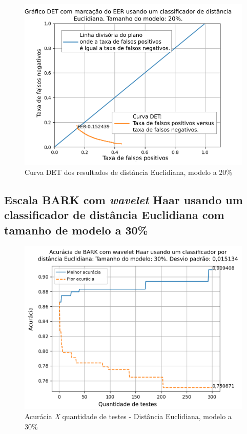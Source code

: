 \begin{figure}[!ht]
	\centering
	\includegraphics[width=.9\linewidth]{images/results/det/DET_for_classifier_Euclidian_20}
	\caption{Curva DET dos resultados de distância Euclidiana, modelo a 20\%}
	\label{fig:detforclassifiereuclidian20}
\end{figure}

\subsection{Escala BARK com \textit{wavelet} Haar usando um classificador de distância Euclidiana com tamanho de modelo a 30\%}



\begin{figure}[ht]
	\centering
	\includegraphics[width=\linewidth]{images/results/confusionMatrices/classifier_Euclidian_30}
	\caption{Acurácia \textit{X} quantidade de testes - Distância Euclidiana, modelo a 30\%}
	\label{fig:classifiereuclidian30}
\end{figure}

